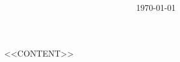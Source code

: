 \documentclass[11pt,a4paper]{article}
\title{\textbf{\doctitle} \\ \large \docsubtitle}
\author{\docauthor}
\date{\today}
\theoremstyle{definition}
\begin{document}
\maketitle

\tableofcontents
\newpage

%
%
%

<<CONTENT>>
\end{document}
